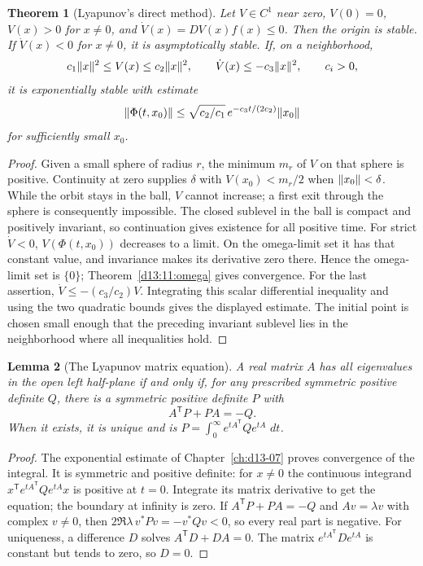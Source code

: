 \documentclass[11pt,oneside]{book}
\newtheorem{theorem}{Theorem}[chapter]
\newtheorem{lemma}[theorem]{Lemma}
\theoremstyle{definition}
\theoremstyle{remark}\newtheorem{remark}[theorem]{Remark}
\newcommand{\dd}{\,d}\newcommand{\id}{\operatorname{id}}
\begin{document}
\begin{theorem}[Lyapunov's direct method]\label{d13:12:lyapunov}
Let \(V\in C^1\) near zero, \(V(0)=0\), \(V(x)>0\) for \(x\ne0\),
and \(\dot V(x)=DV(x)f(x)\le0\). Then the origin is stable.
If \(\dot V(x)<0\) for \(x\ne0\), it is asymptotically stable.
If, on a neighborhood,
\[
 c_1\lVert x\rVert^2\le V(x)\le c_2\lVert x\rVert^2,\qquad
 \dot V(x)\le-c_3\lVert x\rVert^2,\qquad c_i>0,
\]
it is exponentially stable with estimate
\[
 \lVert\Phi(t,x_0)\rVert
 \le\sqrt{c_2/c_1}\,e^{-c_3t/(2c_2)}\lVert x_0\rVert
\]
for sufficiently small \(x_0\).
\end{theorem}
\begin{proof}
Given a small sphere of radius \(r\), the minimum \(m_r\) of \(V\) on
that sphere is positive. Continuity at zero supplies \(\delta\) with
\(V(x_0)<m_r/2\) when \(\lVert x_0\rVert<\delta\).
While the orbit stays in the ball, \(V\) cannot increase; a first exit
through the sphere is consequently impossible. The closed sublevel in
the ball is compact and positively invariant, so continuation gives
existence for all positive time.
For strict \(\dot V<0\), \(V(\Phi(t,x_0))\) decreases to a limit.
On the omega-limit set it has that constant value, and invariance makes
its derivative zero there. Hence the omega-limit set is \(\{0\}\);
Theorem~\ref{d13:11:omega} gives convergence.
For the last assertion,
\(\dot V\le-(c_3/c_2)V\). Integrating this scalar differential inequality
and using the two quadratic bounds gives the displayed estimate.
The initial point is chosen small enough that the preceding invariant
sublevel lies in the neighborhood where all inequalities hold.
\end{proof}

\begin{lemma}[The Lyapunov matrix equation]\label{d13:12:matrix-lyapunov}
A real matrix \(A\) has all eigenvalues in the open left half-plane
if and only if, for any prescribed symmetric positive definite \(Q\),
there is a symmetric positive definite \(P\) with
\[
 A^{\mathsf T}P+PA=-Q .
\]
When it exists, it is unique and is
\(P=\int_0^\infty e^{tA^{\mathsf T}}Qe^{tA}\,\dd t\).
\end{lemma}
\begin{proof}
The exponential estimate of Chapter~\ref{ch:d13-07} proves convergence
of the integral. It is symmetric and positive definite: for \(x\ne0\)
the continuous integrand \(x^{\mathsf T}e^{tA^{\mathsf T}}Qe^{tA}x\)
is positive at \(t=0\). Integrate its matrix derivative to get the
equation; the boundary at infinity is zero.
If \(A^{\mathsf T}P+PA=-Q\) and \(Av=\lambda v\) with complex \(v\ne0\),
then \(2\Re\lambda\,v^*Pv=-v^*Qv<0\), so every real part is negative.
For uniqueness, a difference \(D\) solves \(A^{\mathsf T}D+DA=0\).
The matrix \(e^{tA^{\mathsf T}}De^{tA}\) is constant but tends to zero,
so \(D=0\).
\end{proof}
\end{document}
